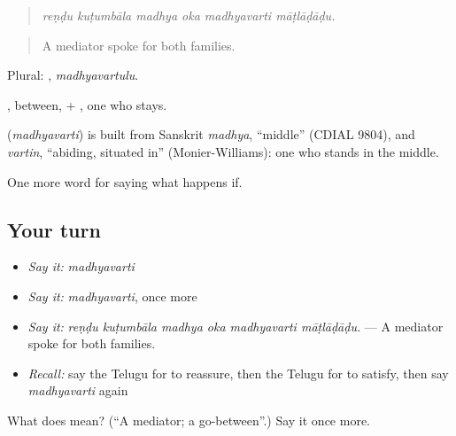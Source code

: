 \begin{quote}
\emph{reṇḍu kuṭumbāla madhya oka madhyavarti māṭlāḍāḍu.}
\end{quote}

\begin{quote}
A mediator spoke for both families.
\end{quote}

Plural: , \emph{madhyavartulu}.

, between, + , one who stays.

\begin{cousinweb}
\textbf{} (\emph{madhyavarti}) is built from Sanskrit \emph{madhya}, \textquotedblleft{}middle\textquotedblright{} (CDIAL 9804), and \emph{vartin}, \textquotedblleft{}abiding, situated in\textquotedblright{} (Monier-Williams): one who stands in the middle.
\end{cousinweb}

\begin{grammarlens}[title={What you've built}]
One more word for saying what happens if.
\end{grammarlens}

\subsection*{Your turn}
\begin{itemize}
\raggedright
  \item \emph{Say it:} \emph{madhyavarti}
  \item \emph{Say it:} \emph{madhyavarti}, once more
  \item \emph{Say it:} \emph{reṇḍu kuṭumbāla madhya oka madhyavarti māṭlāḍāḍu.} — A mediator spoke for both families.
  \item \emph{Recall:} say the Telugu for to reassure, then the Telugu for to satisfy, then say \emph{madhyavarti} again
\end{itemize}

\begin{tcolorbox}[breakable,colback=teal!4,colframe=teal!35!black,title={Before you move on}]
What does  mean? (\textquotedblleft{}A mediator; a go-between\textquotedblright{}.) Say it once more.
\end{tcolorbox}

